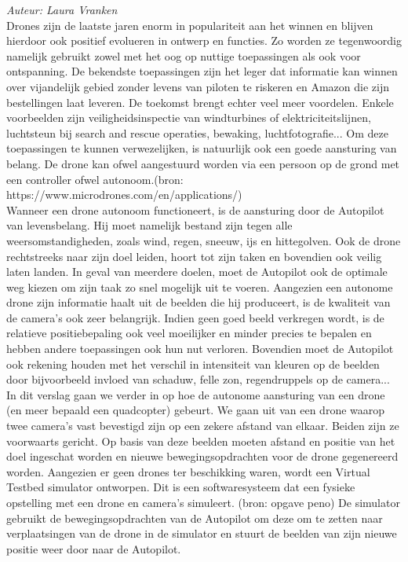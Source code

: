 {\em Auteur: Laura Vranken}\\


Drones zijn de laatste jaren enorm in populariteit aan het winnen en blijven hierdoor ook positief evolueren in ontwerp en functies. Zo worden ze tegenwoordig namelijk gebruikt zowel met het oog op nuttige toepassingen als ook voor ontspanning. De bekendste toepassingen zijn het leger dat informatie kan winnen over vijandelijk gebied zonder levens van piloten te riskeren en Amazon die zijn bestellingen laat leveren. De toekomst brengt echter veel meer voordelen. Enkele voorbeelden zijn veiligheidsinspectie van windturbines of elektriciteitslijnen, luchtsteun bij search and rescue operaties, bewaking, luchtfotografie... Om deze toepassingen te kunnen verwezelijken, is natuurlijk ook een goede aansturing van belang. De drone kan ofwel aangestuurd worden via een persoon op de grond met een controller ofwel autonoom.(bron: https://www.microdrones.com/en/applications/)\\

Wanneer een drone autonoom functioneert, is de aansturing door de Autopilot van levensbelang. Hij moet namelijk bestand zijn tegen alle weersomstandigheden, zoals wind, regen, sneeuw, ijs en hittegolven. Ook de drone rechtstreeks naar zijn doel leiden, hoort tot zijn taken en bovendien ook veilig laten landen. In geval van meerdere doelen, moet de Autopilot ook de optimale weg kiezen om zijn taak zo snel mogelijk uit te voeren. Aangezien een autonome drone zijn informatie haalt uit de beelden die hij produceert, is de kwaliteit van de camera's ook zeer belangrijk. Indien geen goed beeld verkregen wordt, is de relatieve positiebepaling ook veel moeilijker en minder precies te bepalen en hebben andere toepassingen ook hun nut verloren. Bovendien moet de Autopilot ook rekening houden met het verschil in intensiteit van kleuren op de beelden door bijvoorbeeld invloed van schaduw, felle zon, regendruppels op de camera...\\

In dit verslag gaan we verder in op hoe de autonome aansturing van een drone (en meer bepaald een quadcopter) gebeurt. We gaan uit van een drone waarop twee camera's vast bevestigd zijn op een zekere afstand van elkaar. Beiden zijn ze voorwaarts gericht. Op basis van deze beelden moeten afstand en positie van het doel ingeschat worden en nieuwe bewegingsopdrachten voor de drone gegenereerd worden. Aangezien er geen drones ter beschikking waren, wordt een Virtual Testbed simulator ontworpen. Dit is een softwaresysteem dat een fysieke opstelling met een drone en camera's simuleert. (bron: opgave peno) De simulator gebruikt de bewegingsopdrachten van de Autopilot om deze om te zetten naar verplaatsingen van de drone in de simulator en stuurt de beelden van zijn nieuwe positie weer door naar de Autopilot. \\

